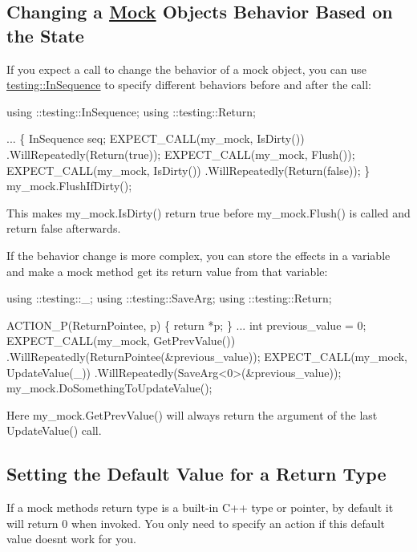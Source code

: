 \subsection*{Changing a \hyperlink{class_mock}{Mock} Object\textquotesingle{}s Behavior Based on the State}

If you expect a call to change the behavior of a mock object, you can use {\ttfamily \hyperlink{classtesting_1_1_in_sequence}{testing\+::\+In\+Sequence}} to specify different behaviors before and after the call\+:


\begin{DoxyCode}
using ::testing::InSequence;
using ::testing::Return;

...
  \{
    InSequence seq;
    EXPECT\_CALL(my\_mock, IsDirty())
        .WillRepeatedly(Return(true));
    EXPECT\_CALL(my\_mock, Flush());
    EXPECT\_CALL(my\_mock, IsDirty())
        .WillRepeatedly(Return(false));
  \}
  my\_mock.FlushIfDirty();
\end{DoxyCode}


This makes {\ttfamily my\+\_\+mock.\+Is\+Dirty()} return {\ttfamily true} before {\ttfamily my\+\_\+mock.\+Flush()} is called and return {\ttfamily false} afterwards.

If the behavior change is more complex, you can store the effects in a variable and make a mock method get its return value from that variable\+:


\begin{DoxyCode}
using ::testing::\_;
using ::testing::SaveArg;
using ::testing::Return;

ACTION\_P(ReturnPointee, p) \{ return *p; \}
...
  int previous\_value = 0;
  EXPECT\_CALL(my\_mock, GetPrevValue())
      .WillRepeatedly(ReturnPointee(&previous\_value));
  EXPECT\_CALL(my\_mock, UpdateValue(\_))
      .WillRepeatedly(SaveArg<0>(&previous\_value));
  my\_mock.DoSomethingToUpdateValue();
\end{DoxyCode}


Here {\ttfamily my\+\_\+mock.\+Get\+Prev\+Value()} will always return the argument of the last {\ttfamily Update\+Value()} call.

\subsection*{Setting the Default Value for a Return Type}

If a mock method\textquotesingle{}s return type is a built-\/in C++ type or pointer, by default it will return 0 when invoked. You only need to specify an action if this default value doesn\textquotesingle{}t work for you.

